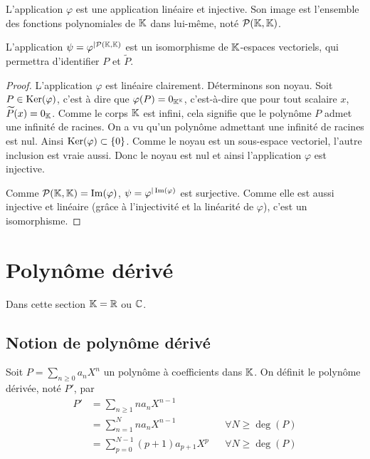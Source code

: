 \begin{prop}
  L'application \(\varphi\) est une application linéaire et injective. Son image 
  est l'ensemble des fonctions polynomiales de \(\mathbb{K}\) dans lui-même, noté 
  \(\mathcal{P}(\mathbb{K},\mathbb{K})\).

  L'application \(\psi = \varphi^{|\mathcal{P}(\mathbb{K},\mathbb{K})}\) est un isomorphisme de 
  \(\mathbb{K}\)-espaces vectoriels, qui permettra d'identifier \(P\) et 
  \(\widetilde{P}\).
\end{prop}
\begin{proof}
  L'application \(\varphi\) est linéaire clairement. Déterminons son noyau. Soit 
  \(P \in \operatorname{Ker}(\varphi)\), c'est à dire que \(\varphi(P) = 0_{\mathbb{K}^{\mathbb{K}}}\), 
  c'est-à-dire que pour tout scalaire \(x\), \(\widetilde{P}(x) = 0_{\mathbb{K}}\). 
  Comme le corps \(\mathbb{K}\) est infini, cela signifie que le polynôme \(P\) admet 
  une infinité de racines. On a vu qu'un polynôme admettant une infinité de 
  racines est nul. Ainsi \(\operatorname{Ker}(\varphi) \subset \{0\}\). Comme le noyau est un 
  sous-espace vectoriel, l'autre inclusion est vraie aussi. Donc le noyau est 
  nul et ainsi l'application \(\varphi\) est injective.

  Comme \(\mathcal{P}(\mathbb{K},\mathbb{K}) = \operatorname{Im}(\varphi)\), \(\psi = \varphi^{|\operatorname{Im}(\varphi)}\) est 
  surjective. Comme elle est aussi injective et linéaire (grâce à l'injectivité 
  et la linéarité de \(\varphi\)), c'est un isomorphisme.
\end{proof}

\section{Polynôme dérivé}

Dans cette section \(\mathbb{K} = \mathbb{R}\) ou \(\mathbb{C}\).

\subsection{Notion de polynôme dérivé}

\begin{defdef}
  Soit \(P = \sum_{n \geqslant 0}a_n X^n\) un polynôme à coefficients dans 
  \(\mathbb{K}\). On définit le polynôme dérivée, noté \(P'\), par
  \begin{align}
    P' &= \sum_{n \geqslant 1} na_n X^{n-1} \\
    & = \sum_{n = 1}^N na_n X^{n-1} && \forall N \geqslant \deg(P) \\
    & = \sum_{p = 0}^{N-1} (p+1)a_{p+1} X^{p} && \forall N \geqslant \deg(P) \\
  \end{align}
\end{defdef}

